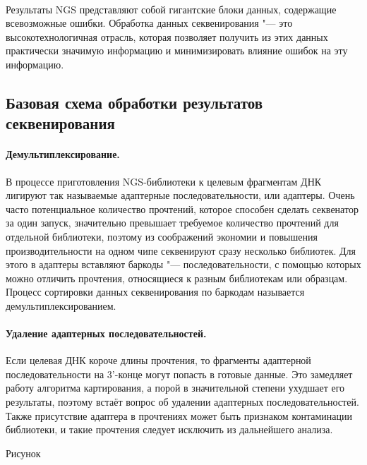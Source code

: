 \documentclass[a4paper,12pt]{article}
\begin{document}
~

Результаты NGS представляют собой гигантские блоки данных, содержащие всевозможные ошибки.
Обработка данных секвенирования "--- это высокотехнологичная отрасль, которая позволяет получить из этих данных практически значимую информацию и минимизировать влияние ошибок на эту информацию.

\subsection{Базовая схема обработки результатов секвенирования}

\paragraph{Демультиплексирование.}
В процессе приготовления NGS-библиотеки к целевым фрагментам ДНК лигируют так называемые адаптерные последовательности, или адаптеры.
Очень часто потенциальное количество прочтений, которое способен сделать секвенатор за один запуск, значительно превышает требуемое количество прочтений для отдельной библиотеки, поэтому из соображений экономии и повышения производительности на одном чипе секвенируют сразу несколько библиотек.
Для этого в адаптеры вставляют баркоды "--- последовательности, с помощью которых можно отличить прочтения, относящиеся к разным библиотекам или образцам.
Процесс сортировки данных секвенирования по баркодам называется демультиплексированием.

\paragraph{Удаление адаптерных последовательностей.}
Если целевая ДНК короче длины прочтения, то фрагменты адаптерной последовательности на 3'-конце могут попасть в готовые данные.
Это замедляет работу алгоритма картирования, а порой в значительной степени ухудшает его результаты, поэтому встаёт вопрос об удалении адаптерных последовательностей.
Также присутствие адаптера в прочтениях может быть признаком контаминации библиотеки, и такие прочтения следует исключить из дальнейшего анализа\cite{cutadapt}.

\begin{Huge}Рисунок\end{Huge}
\end{document}
